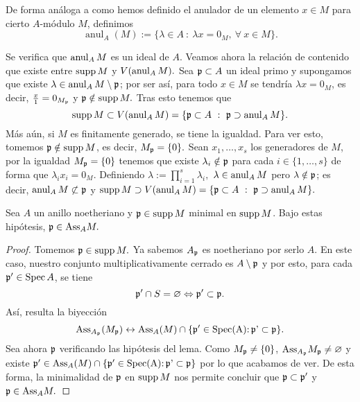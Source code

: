 \documentclass[../main.tex]{subfiles}
\begin{document}
\begin{definition}
	De forma análoga a como hemos definido el anulador de un elemento $x\in M$ para cierto $A$-módulo $M$, definimos
	$$\operatorname{anul}_A(M):=\{\lambda\in A\ :\ \lambda x=0_M,\ \forall\ x\in M\}.$$
\end{definition}

Se verifica que $\operatorname{anul}_A M$ es un ideal de $A$. Veamos ahora la relación de contenido que existe entre $\operatorname{supp} M$ y $V(\operatorname{anul}_A M).$ Sea $\mathfrak{p}\subset A$ un ideal primo y supongamos que existe $\lambda\in\operatorname{anul}_A M\setminus\mathfrak{p}$; por ser así, para todo $x\in M$ se tendría $\lambda x=0_M$, es decir, $\frac{x}{1}=0_{M_{\mathfrak{p}}}$ y $\mathfrak{p}\notin\operatorname{supp} M.$ Tras esto tenemos que
$$\operatorname{supp} M\subset V(\operatorname{anul}_A M)=\{\mathfrak{p}\subset A\ :\ \mathfrak{p}\supset\operatorname{anul}_A M\}.$$
Más aún, si $M$ es finitamente generado, se tiene la igualdad. Para ver esto, tomemos $\mathfrak{p}\notin\operatorname{supp} M$, es decir, $M_{\mathfrak{p}}=\{0\}.$ Sean $x_1,\dots,x_s$ los generadores de $M$, por la igualdad $M_{\mathfrak{p}}=\{0\}$ tenemos que existe $\lambda_i\notin\mathfrak{p}$ para cada $i\in\{1,\dots,s\}$ de forma que $\lambda_i x_i=0_M.$ Definiendo $\lambda:=\prod_{i=1}^s\lambda_i,$ $\lambda\in\operatorname{anul}_A M$ pero $\lambda\notin\mathfrak{p}$; es decir, $\operatorname{anul}_A M\not\subset\mathfrak{p}$ y $\supp M\supset V(\anul_A M)=\{\p\subset A\ :\ \p\supset\anul_A M\}.$

\begin{lemma}
	Sea $A$ un anillo noetheriano y $\mathfrak{p}\in\operatorname{supp} M$ minimal en $\operatorname{supp} M$. Bajo estas hipótesis, $\mathfrak{p}\in\text{Ass}_A M.$
\end{lemma}
\begin{proof}
	Tomemos $\mathfrak{p}\in\operatorname{supp} M.$ Ya sabemos $A_{\mathfrak{p}}$ es noetheriano por serlo $A.$ En este caso, nuestro conjunto multiplicativamente cerrado es $A\setminus\mathfrak{p}$ y por esto, para cada $\mathfrak{p}'\in\operatorname{Spec} A$, se tiene
	$$\mathfrak{p}'\cap S=\varnothing\Leftrightarrow \mathfrak{p}'\subset\mathfrak{p}.$$
	Así, resulta la biyección
	$$\text{Ass}_{A_{\mathfrak{p}}}(M_{\mathfrak{p}})\leftrightarrow\text{Ass}_A(M)\cap\{\mathfrak{p}'\in\operatorname{Spec(A):\mathfrak{p}'\subset\mathfrak{p}}\}.$$
	Sea ahora $\mathfrak{p}$ verificando las hipótesis del lema.  Como $M_{\mathfrak{p}}\neq\{0\}$, $\text{Ass}_{A_{\mathfrak{p}}} M_{\mathfrak{p}}\neq\varnothing$ y existe $\mathfrak{p}'\in \text{Ass}_A(M)\cap\{\mathfrak{p}'\in\operatorname{Spec(A):\mathfrak{p}'\subset\mathfrak{p}}\}$ por lo que acabamos de ver. De esta forma, la minimalidad de $\mathfrak{p}$ en $\operatorname{supp} M$ nos permite concluir que $\mathfrak{p}\subset\mathfrak{p}'$ y $\mathfrak{p}\in \text{Ass}_A M.$
\end{proof}
\end{document}
